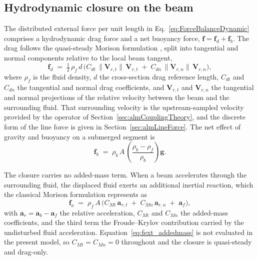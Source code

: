\subsection{Hydrodynamic closure on the beam}
\label{sec:beamExternalLoading}

\noindent
The distributed external force per unit length in Eq.~\eqref{eq:ForceBalanceDynamic} comprises a hydrodynamic drag force and a net buoyancy force, $\mathbf{f} = \mathbf{f}_{d} + \mathbf{f}_{b}$. The drag follows the quasi-steady Morison formulation \citep{morison_force_1950}, split into tangential and normal components relative to the local beam tangent,
\begin{equation}
\mathbf{f}_{d} \;=\; \tfrac{1}{2}\,\rho_{f}\,d\,
\bigl(C_{dt}\,\lVert\mathbf{V}_{r,t}\rVert\,\mathbf{V}_{r,t}
\;+\; C_{dn}\,\lVert\mathbf{V}_{r,n}\rVert\,\mathbf{V}_{r,n}\bigr),
\label{eq:fext_drag}
\end{equation}
where $\rho_{f}$ is the fluid density, $d$ the cross-section drag reference length, $C_{dt}$ and $C_{dn}$ the tangential and normal drag coefficients, and $\mathbf{V}_{r,t}$ and $\mathbf{V}_{r,n}$ the tangential and normal projections of the relative velocity between the beam and the surrounding fluid. That surrounding velocity is the upstream-sampled velocity provided by the operator of Section~\ref{sec:almCouplingTheory}, and the discrete form of the line force is given in Section~\ref{sec:almLineForce}. The net effect of gravity and buoyancy on a submerged segment is
\begin{equation}
\mathbf{f}_{b} \;=\; \rho_{b}\,A\,\!\left(\frac{\rho_{b}-\rho_{f}}{\rho_{b}}\right)\mathbf{g}.
\label{eq:fext_buoyancy}
\end{equation}

\noindent
The closure carries no added-mass term. When a beam accelerates through the surrounding fluid, the displaced fluid exerts an additional inertial reaction, which the classical Morison formulation represents as
\begin{equation}
\mathbf{f}_{a} \;=\; \rho_{f}\,A\,\bigl(
C_{Mt}\,\mathbf{a}_{r,t}
\;+\; C_{Mn}\,\mathbf{a}_{r,n}
\;+\; \mathbf{a}_{f}\bigr),
\label{eq:fext_addedmass}
\end{equation}
with $\mathbf{a}_{r} = \mathbf{a}_{b} - \mathbf{a}_{f}$ the relative acceleration, $C_{Mt}$ and $C_{Mn}$ the added-mass coefficients, and the third term the Froude--Krylov contribution carried by the undisturbed fluid acceleration. Equation~\eqref{eq:fext_addedmass} is not evaluated in the present model, so $C_{Mt} = C_{Mn} = 0$ throughout and the closure is quasi-steady and drag-only.

